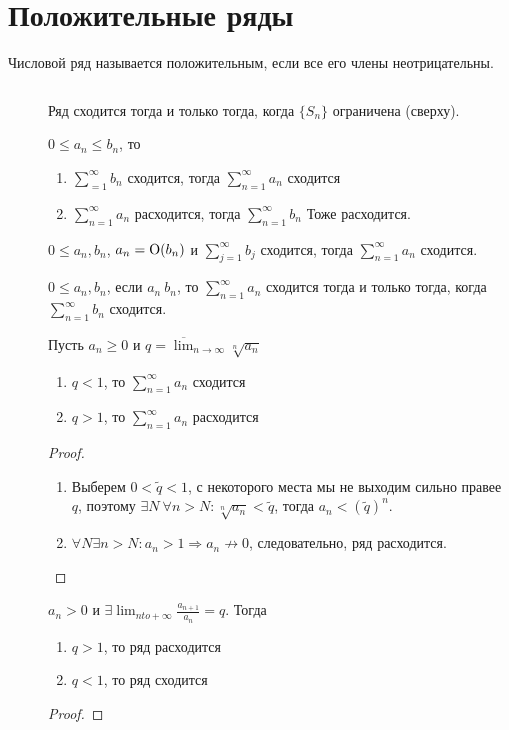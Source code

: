 \section{Положительные ряды}
\begin{defn}
    Числовой ряд называется {\sf положительным}, если все его члены неотрицательны.  
\end{defn}
\begin{prop}

    $ $
    \begin{description}
	\item[] Ряд сходится тогда и только тогда, когда  $ \{S_n\}$ ограничена (сверху).
	\item[] $ 0 \le a_n \le b_n$, то
	    \begin{enumerate}
		\item $ \sum_{=1}^{\infty} b_n$ сходится, тогда $ \sum_{n=1}^{\infty} a_n $ сходится
		\item $ \sum_{n=1}^{\infty} a_n$ расходится, тогда $ \sum_{n=1}^{\infty} b_n$ Тоже расходится.
	    \end{enumerate}
	\item[] $ 0 \le a_n, b_n$, $ a_n = {\mathop{\text{\rm O}}}(b_n)$ и  $ \sum_{j=1}^{\infty} b_j$ сходится, тогда $ \sum_{n=1}^{\infty} a_n$ сходится. 
	\item[] $ 0 \le a_n , b_n$, если  $ a_n ~ b_n$, то  $ \sum_{n=1}^{\infty} a_n$ сходится тогда и только тогда, когда  $ \sum_{n=1}^{\infty} b_n$ сходится.
	\item[] Пусть $ a_n \ge 0$ и $ q = \overline{\lim}_{n \to \infty} \sqrt[n]{ a_n} $
	    \begin{enumerate}
		\item $ q < 1$, то  $ \sum_{n=1}^{\infty} a_n $ сходится
		    \item $ q > 1$, то $ \sum_{n=1}^{\infty}a_n $ расходится
	    \end{enumerate}
	    \begin{proof}

		$ $
	        \begin{enumerate}
		    \item Выберем $ 0<\tilde q < 1 $, с некоторого места мы не выходим сильно правее  $ q$, поэтому  $ \exists  N ~ \forall  n > N \colon \sqrt[n]{ a_n} < \tilde q  $, тогда $ a_n < (\tilde q)^{n}$.
		    \item $ \forall   N   \exists  n > N \colon  a_n > 1 \Longrightarrow a_n  \not\to 0$, следовательно, ряд расходится.
	        \end{enumerate}
	    \end{proof}
	\item[] $ a_n > 0$ и  $ \exists \lim_{n to + \infty} \frac{a_{n+1}}{a_n} = q$. Тогда 
	    \begin{enumerate}
		\item $ q> 1$, то ряд расходится
		\item  $ q < 1$, то ряд сходится
	    \end{enumerate}
	    \begin{proof}
	        

\end{proof}
\end{description}
\end{prop}
